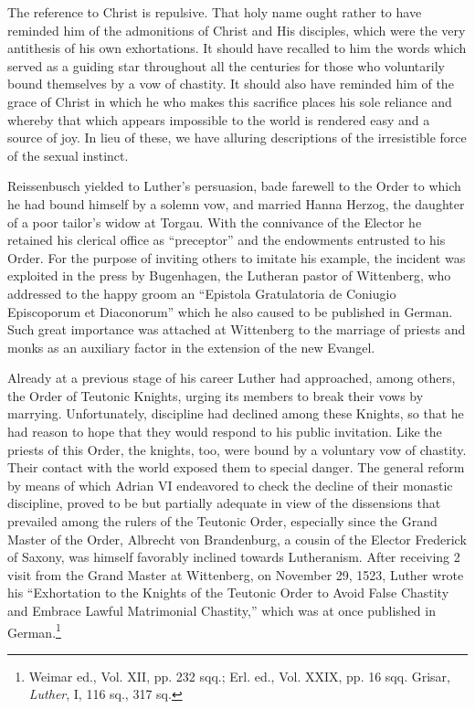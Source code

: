 The reference to Christ is repulsive. That holy name ought rather to have
reminded him of the admonitions of Christ and His disciples, which were
the very antithesis of his own exhortations. It should have recalled to him
the words which served as a guiding star throughout all the centuries
for those who voluntarily bound themselves by a vow of chastity.
It should also have reminded him of the grace of Christ in which he who
makes this sacrifice places his sole reliance and whereby that which appears
impossible to the world is rendered easy and a source of joy. In lieu of these,
we have alluring descriptions of the irresistible force of the sexual instinct.

Reissenbusch yielded to Luther’s persuasion, bade farewell to the
Order to which he had bound himself by a solemn vow, and married
Hanna Herzog, the daughter of a poor tailor’s widow at Torgau.
With the connivance of the Elector he retained his clerical office as
“preceptor” and the endowments entrusted to his Order. For the purpose
of inviting others to imitate his example, the incident was exploited
in the press by Bugenhagen, the Lutheran pastor of Wittenberg,
who addressed to the happy groom an “Epistola Gratulatoria
de Coniugio Episcoporum et Diaconorum” which he also caused to
be published in German. Such great importance was attached at Wittenberg
to the marriage of priests and monks as an auxiliary factor
in the extension of the new Evangel.

Already at a previous stage of his career Luther had approached,
among others, the Order of Teutonic Knights, urging its members
to break their vows by marrying. Unfortunately, discipline had declined
among these Knights, so that he had reason to hope that they
would respond to his public invitation. Like the priests of this Order,
the knights, too, were bound by a voluntary vow of chastity. Their
contact with the world exposed them to special danger. The general
reform by means of which Adrian VI endeavored to check the decline
of their monastic discipline, proved to be but partially adequate in
view of the dissensions that prevailed among the rulers of the Teutonic
Order, especially since the Grand Master of the Order, Albrecht
von Brandenburg, a cousin of the Elector Frederick of Saxony, was
himself favorably inclined towards Lutheranism. After receiving 2
visit from the Grand Master at Wittenberg, on November 29, 1523,
Luther wrote his “Exhortation to the Knights of the Teutonic Order
to Avoid False Chastity and Embrace Lawful Matrimonial Chastity,”
which was at once published in German.\footnote
{Weimar ed., Vol. XII, pp. 232 sqq.; Erl. ed., Vol. XXIX, pp. 16 sqq. Grisar, \textit{Luther},
I, 116 sq., 317 sq.}

